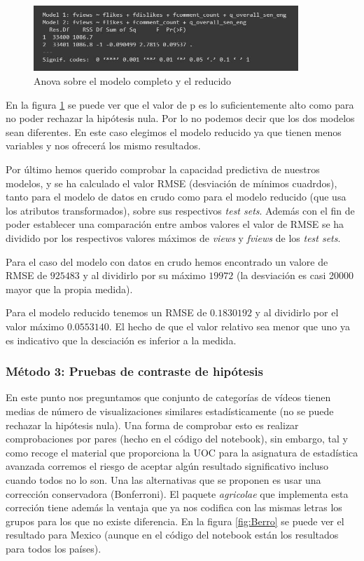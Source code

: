 \documentclass[a4paper,12pt]{article}
\begin{document}
\begin{figure}[h!]
\centering
\includegraphics[width=10cm]{anova_modelos.JPG}
\caption{Anova sobre el modelo completo y el reducido}
\label{fig:anov}
\end{figure}

En la figura \ref{fig:anov} se puede ver que el valor de p es lo suficientemente alto como para no poder rechazar la hip\'otesis nula. Por lo no podemos decir que los dos modelos sean diferentes. En este caso elegimos el modelo reducido ya que tienen menos variables y nos ofrecer\'a los mismo resultados.

Por \'ultimo hemos querido comprobar la capacidad predictiva de nuestros modelos, y se ha calculado el valor RMSE (desviaci\'on de m\'inimos cuadrdos), tanto para el modelo de datos en crudo como para el modelo reducido (que usa los atributos transformados), sobre sus respectivos {\itshape test sets}. Adem\'as con el fin de poder establecer una comparaci\'on entre ambos valores el valor de RMSE se ha dividido por los respectivos valores m\'aximos de {\itshape views} y {\itshape fviews} de los {\itshape test sets}.

Para el caso del modelo con datos en crudo hemos encontrado un valore de RMSE de $925483$ y al dividirlo por su m\'aximo $19972$ (la desviaci\'on es casi 20000 mayor que la propia medida). 

Para el modelo reducido tenemos un RMSE de $0.1830192$ y al dividirlo por el valor m\'aximo $0.0553140$. El hecho de que el valor relativo sea menor que uno ya es indicativo que la desciaci\'on es inferior a la medida.  

\subsubsection{M\'etodo 3: Pruebas de contraste de hip\'otesis}

En este punto nos preguntamos que conjunto de categor\'ias de v\'ideos tienen medias de n\'umero de visualizaciones similares estad\'isticamente (no se puede rechazar la hip\'otesis nula). Una forma de comprobar esto es realizar comprobaciones por pares (hecho en el c\'odigo del notebook), sin embargo, tal y como recoge el material que proporciona la UOC para la asignatura de estad\'istica avanzada corremos el riesgo de aceptar alg\'un resultado significativo incluso cuando todos no lo son. Una las alternativas que se proponen es usar una correcci\'on conservadora (Bonferroni). El paquete {\itshape agricolae} que implementa esta correci\'on tiene adem\'as la ventaja que ya nos codifica con las mismas letras los grupos para los que no existe diferencia. En la figura \ref{fig:Berro} se puede ver el resultado para Mexico (aunque en el c\'odigo del notebook est\'an los resultados para todos los pa\'ises).
\end{document}
